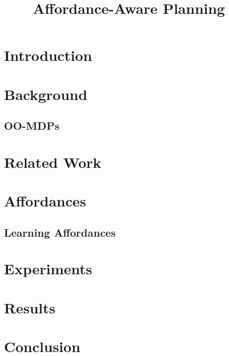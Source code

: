 \documentclass[conference]{IEEEtran}
\begin{document}
\title{Affordance-Aware Planning}

\author{
}

\maketitle

\begin{abstract}

\end{abstract}

\IEEEpeerreviewmaketitle

\section{Introduction}
\label{sec:introduction}

\section{Background}
\label{sec:background}
\subsection{OO-MDPs}

\section{Related Work}
\label{sec:related-work}

\section{Affordances}
\label{sec:affordances}
\subsection{Learning Affordances}

\section{Experiments}
\label{sec:experiments}

\section{Results}
\label{sec:results}

\section{Conclusion}
\label{sec:conclusion}

{\small


}
\end{document}
